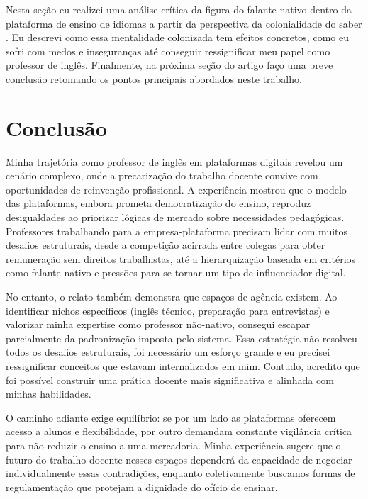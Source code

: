 \documentclass[portuguese]{textolivre}
\begin{document}
Nesta seção eu realizei uma análise crítica da figura do falante nativo dentro da plataforma de ensino de idiomas a partir da perspectiva da colonialidade do saber \cite{lander2005}. Eu descrevi como essa mentalidade colonizada tem efeitos concretos, como eu sofri com medos e inseguranças até conseguir ressignificar meu papel como professor de inglês. Finalmente, na próxima seção do artigo faço uma breve conclusão retomando os pontos principais abordados neste trabalho.

\section{Conclusão}
Minha trajetória como professor de inglês em plataformas digitais revelou um cenário complexo, onde a precarização do trabalho docente convive com oportunidades de reinvenção profissional. A experiência mostrou que o modelo das plataformas, embora prometa democratização do ensino, reproduz desigualdades ao priorizar lógicas de mercado sobre necessidades pedagógicas. Professores trabalhando para a empresa-plataforma precisam lidar com muitos desafios estruturais, desde a competição acirrada entre colegas para obter remuneração sem direitos trabalhistas, até a hierarquização baseada em critérios como falante nativo e pressões para se tornar um tipo de influenciador digital.

No entanto, o relato também demonstra que espaços de agência existem. Ao identificar nichos específicos (inglês técnico, preparação para entrevistas) e valorizar minha expertise como professor não-nativo, consegui escapar parcialmente da padronização imposta pelo sistema. Essa estratégia não resolveu todos os desafios estruturais, foi necessário um esforço grande e eu precisei ressignificar conceitos que estavam internalizados em mim. Contudo, acredito que foi possível construir uma prática docente mais significativa e alinhada com minhas habilidades.

O caminho adiante exige equilíbrio: se por um lado as plataformas oferecem acesso a alunos e flexibilidade, por outro demandam constante vigilância crítica para não reduzir o ensino a uma mercadoria. Minha experiência sugere que o futuro do trabalho docente nesses espaços dependerá da capacidade de negociar individualmente essas contradições, enquanto coletivamente buscamos formas de regulamentação que protejam a dignidade do ofício de ensinar.


\printbibliography\label{sec-bib}


\end{document}
